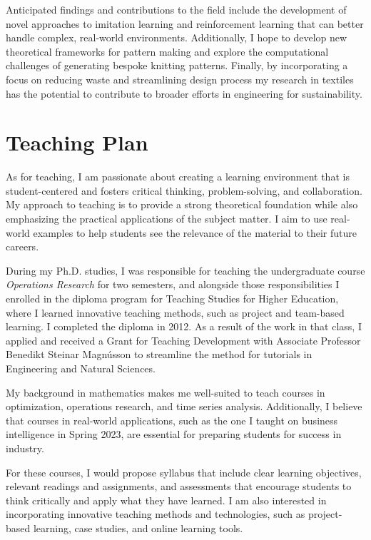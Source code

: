 \documentclass[]{cv} %
\begin{document}
Anticipated findings and contributions to the field include the development of novel approaches to imitation learning and reinforcement learning that can better handle complex, real-world environments. Additionally, I hope to develop new theoretical frameworks for pattern making and explore the computational challenges of generating bespoke knitting patterns. Finally, by incorporating a focus on reducing waste and streamlining design process my research in textiles has the potential to contribute to broader efforts in engineering for sustainability.

\section{Teaching Plan}
As for teaching, I am passionate about creating a learning environment that is student-centered and fosters critical thinking, problem-solving, and collaboration. My approach to teaching is to provide a strong theoretical foundation while also emphasizing the practical applications of the subject matter. I aim to use real-world examples to help students see the relevance of the material to their future careers.

During my Ph.D. studies, I was responsible for teaching the undergraduate course \textit{Operations Research} for two semesters, and alongside those responsibilities I enrolled in the diploma program for Teaching Studies for Higher Education, where I learned innovative teaching methods, such as project and team-based learning. I completed the diploma in 2012. As a result of the work in that class, I applied and received a Grant for Teaching Development with Associate Professor Benedikt Steinar Magnússon to streamline the method for tutorials in Engineering and Natural Sciences. 

My background in mathematics makes me well-suited to teach courses in optimization, operations research, and time series analysis. Additionally, I believe that courses in real-world applications, such as the one I taught on business intelligence in Spring 2023, are essential for preparing students for success in industry.

For these courses, I would propose syllabus that include clear learning objectives, relevant readings and assignments, and assessments that encourage students to think critically and apply what they have learned. I am also interested in incorporating innovative teaching methods and technologies, such as project-based learning, case studies, and online learning tools.
\end{document}
